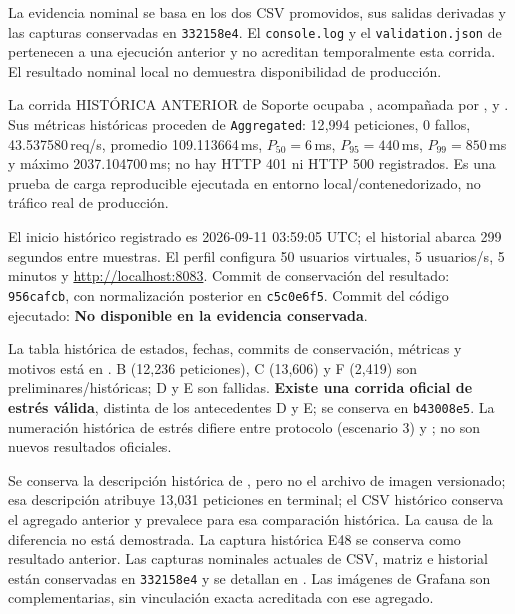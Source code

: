 \documentclass[11pt,a4paper]{article}
\begin{document}
La evidencia nominal se basa en los dos CSV promovidos, sus salidas derivadas y las capturas conservadas en \texttt{332158e4}. El \texttt{console.log} y el \texttt{validation.json} de  pertenecen a una ejecución anterior y no acreditan temporalmente esta corrida. El resultado nominal local no demuestra disponibilidad de producción.

La corrida HISTÓRICA ANTERIOR de Soporte ocupaba , acompañada por ,  y . Sus métricas históricas proceden de \texttt{Aggregated}: 12{,}994 peticiones, 0 fallos, 43.537580\,req/s, promedio 109.113664\,ms, $P_{50}=6$\,ms, $P_{95}=440$\,ms, $P_{99}=850$\,ms y máximo 2037.104700\,ms; no hay HTTP 401 ni HTTP 500 registrados. Es una prueba de carga reproducible ejecutada en entorno local/contenedorizado, no tráfico real de producción.

El inicio histórico registrado es 2026-09-11 03:59:05 UTC; el historial abarca 299 segundos entre muestras. El perfil configura 50 usuarios virtuales, 5 usuarios/s, 5 minutos y \url{http://localhost:8083}. Commit de conservación del resultado: \texttt{956cafcb}, con normalización posterior en \texttt{c5c0e6f5}. Commit del código ejecutado: \textbf{No disponible en la evidencia conservada}.

La tabla histórica de estados, fechas, commits de conservación, métricas y motivos está en . B (12{,}236 peticiones), C (13{,}606) y F (2{,}419) son preliminares/históricas; D y E son fallidas. \textbf{Existe una corrida oficial de estrés válida}, distinta de los antecedentes D y E; se conserva en \texttt{b43008e5}. La numeración histórica de estrés difiere entre protocolo (escenario 3) y ; no son nuevos resultados oficiales.

Se conserva la descripción histórica de , pero no el archivo de imagen versionado; esa descripción atribuye 13{,}031 peticiones en terminal; el CSV histórico conserva el agregado anterior y prevalece para esa comparación histórica. La causa de la diferencia no está demostrada. La captura histórica E48 se conserva como resultado anterior. Las capturas nominales actuales de CSV, matriz e historial están conservadas en \texttt{332158e4} y se detallan en . Las imágenes de Grafana son complementarias, sin vinculación exacta acreditada con ese agregado.
\end{document}
